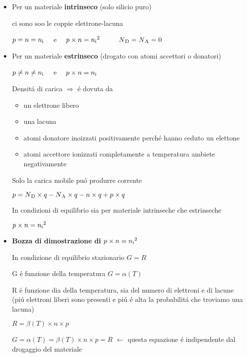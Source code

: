 \begin{itemize}
    \item Per un materiale \textbf{intrinseco} (solo silicio puro)

        ci sono soo le coppie elettrone-lacuna

        $p=n=n\textsubscript{i}\quad$ e $\quad p \times n = n\textsubscript{i}^2$ $\qquad$ $N\textsubscript{D} = N\textsubscript{A} = 0$

    \item Per un materiale \textbf{estrinseco} (drogato con atomi accettori o donatori)

        $p \neq n \neq n\textsubscript{i} \quad$ e $\quad p \times n = n\textsubscript{i}$

        Densit\'a di carica $\Rightarrow$ \'e dovuta da
        \begin{itemize}
            \item un elettrone libero
            \item una lacuna
            \item atomi donatore inoizzati positivamente perch\'e hanno ceduto un elettone
            \item atomi accettore ionizzati completamente a temperatura ambiete negativamente
        \end{itemize}

        Solo la carica mobile pu\'o produrre corrente

        $p = N\textsubscript{D} \times q - N\textsubscript{A} \times q - n \times q + p \times q$

        In condizioni di equilibrio sia per materiale intrinseche che estrinseche

        $p \times n = n\textsubscript{i}^2$

    \item \textbf{Bozza di dimostrazione di} $p\times n = n\textsubscript{i}^2$

        In condizione di equilibrio stazionario $G=R$

        G \'e funzione della temperatura $G = \alpha (T)$

        R \'e funzione dia della temperatura, sia del numero di elettroni e di lacune (pi\'u elettroni liberi sono presenti e pi\'u \'e alta la probabilit\'a che troviamo una lacuna)

        $R = \beta (T) \times n \times p$

        $G = \alpha (T) = \beta (T) \times n \times p = R$ $\leftarrow$ questa equazione \'e indipendente dal drogaggio del materiale

\end{itemize}

